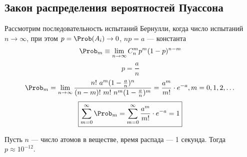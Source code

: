 \subsection{Закон распределения вероятностей Пуассона}
Рассмотрим последовательность испытаний Бернулли, когда число испытаний $n \to \infty$, при этом $p = \Prob(A_i) \to 0$, $np = a$ --- константа
\[
	\Prob_m \equiv \lim_{n \to \infty} C_n^m p^m (1-p)^{n-m}
\]
\[ p = \frac{a}{n} \]
\[ \Prob_m = \lim_{n \to \infty} \frac{n!\ a^m (1 - \frac{a}{n})^n}{(n-m)!\ m!\ n^m (1 - \frac{a}{n})^m} = \frac{a^m}{m!} \cdot e^{-a}, m = 0, 1, 2, \dots \]
\[ \boxed{\sum\limits_{m=0}^\infty \Prob_m = \sum\limits_{m=0}^\infty \frac{a^m}{m!} \cdot e^{-a} = 1}\]
\begin{example}
	Пусть $n$ --- число атомов в веществе, время распада --- 1 секунда. Тогда $p \approx 10^{-12}$.
\end{example}


